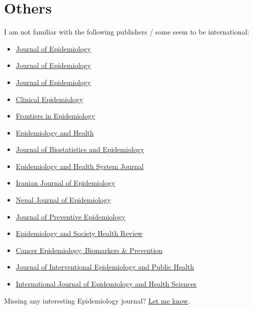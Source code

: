 \documentclass[
  12pt,
]{article}
\providecommand{\tightlist}{%
  \setlength{\itemsep}{0pt}\setlength{\parskip}{0pt}}
\begin{document}
\hypertarget{others}{%
\section*{Others}\label{others}}

I am not familiar with the following publishers / some seem to be
international:

\begin{itemize}
\tightlist
\item
  \href{https://jeaweb.jp/journal/}{Journal of Epidemiology}
\item
  \href{https://www.jstage.jst.go.jp/browse/jea}{Journal of
  Epidemiology}
\item
  \href{https://doaj.org/toc/1349-9092}{Journal of Epidemiology}
\item
  \href{https://www.dovepress.com/clinical-epidemiology-journal}{Clinical
  Epidemiology}
\item
  \href{https://www.frontiersin.org/journals/epidemiology}{Frontiers in
  Epidemiology}
\item
  \href{https://www.e-epih.org/}{Epidemiology and Health}
\item
  \href{https://jbe.tums.ac.ir/index.php/jbe}{Journal of Biostatistics
  and Epidemiology}
\item
  \href{http://ijer.skums.ac.ir/}{Epidemiology and Health System
  Journal}
\item
  \href{https://irje.tums.ac.ir/en}{Iranian Journal of Epidemiology}
\item
  \href{https://www.nepjol.info/index.php/NJE}{Nepal Journal of
  Epidemiology}
\item
  \href{https://jprevepi.com/}{Journal of Preventive Epidemiology}
\item
  \href{http://journal2.uad.ac.id/index.php/eshr/index}{Epidemiology and
  Society Health Review}
\item
  \href{https://aacrjournals.org/cebp}{Cancer Epidemiology, Biomarkers
  \& Prevention}
\item
  \href{https://www.afenet-journal.net/\#gsc.tab=0}{Journal of
  Interventional Epidemiology and Public Health}
\item
  \href{http://www.ijehs.com/}{International Journal of Epidemiology and
  Health Sciences}
\end{itemize}

Missing any interesting Epidemiology journal?
\href{https://ehsank.com/}{Let me know}.
\end{document}
